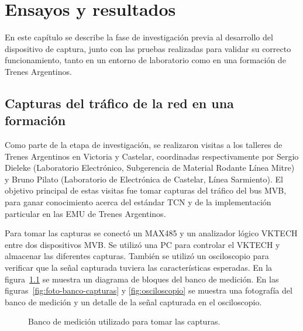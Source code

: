 \chapter{Ensayos y resultados}

\label{cap:EnsayosResultados}

En este capítulo se describe la fase de investigación previa al desarrollo del dispositivo de captura, junto con las pruebas realizadas para validar su correcto funcionamiento, tanto en un entorno de laboratorio como en una formación de Trenes Argentinos.

\section{Capturas del tráfico de la red en una formación}
\label{sec:capturas}

Como parte de la etapa de investigación, se realizaron visitas a los talleres de Trenes Argentinos en Victoria y Castelar, coordinadas respectivamente por Sergio Dieleke (Laboratorio Electrónico, Subgerencia de Material Rodante Línea Mitre) y Bruno Pilato (Laboratorio de Electrónica de Castelar, Línea Sarmiento).
El objetivo principal de estas visitas fue tomar capturas del tráfico del bus MVB, para ganar conocimiento acerca del estándar TCN y de la implementación particular en las EMU de Trenes Argentinos.

Para tomar las capturas se conectó un MAX485 y un analizador lógico VKTECH entre dos dispositivos MVB.
Se utilizó una PC para controlar el VKTECH y almacenar las diferentes capturas.
También se utilizó un osciloscopio para verificar que la señal capturada tuviera las características esperadas.
En la figura~\ref{fig:banco-capturas} se muestra un diagrama de bloques del banco de medición.
En las figuras~\ref{fig:foto-banco-capturas} y \ref{fig:osciloscopio} se muestra una fotografía del banco de medición y un detalle de la señal capturada en el osciloscopio.

\begin{figure}[htbp]
	\centering
    {
        \fontsize{9pt}{9pt}\selectfont
        
    }
	\caption{Banco de medición utilizado para tomar las capturas.}
    \label{fig:banco-capturas}
\end{figure}

